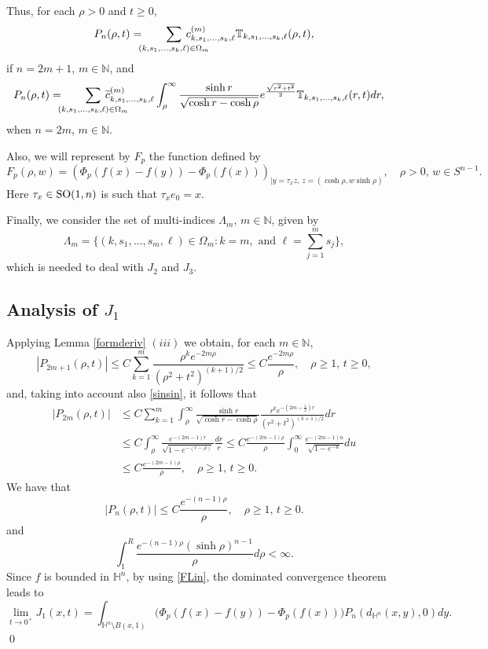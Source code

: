 \documentclass[a4paper,10pt, reqno]{amsart}
\theoremstyle{definition}
\theoremstyle{remark}
\numberwithin{equation}{section}
\begin{document}
{$$$$
Thus, for each $\rho >0$ and $t\geq 0$,
\begin{equation}\label{Pnodd}
P_n(\rho ,t)=\hspace{-0.2cm}\sum_{(k, s_1,\ldots,s_k,\ell )\in \Omega_m}\hspace{-0.8cm}c_{k,s_1,\ldots, s_k,\ell}^{(m)}\mathbb T_{k,s_1,\ldots, s_k,\ell}(\rho, t),
\end{equation}
if $n=2m+1$, $m\in \mathbb N$, and 
\begin{align}\label{Pneven}
P_n(\rho ,t)&=\hspace{-0.2cm}\sum_{(k, s_1,\ldots,s_k,\ell )\in \Omega_m}\hspace{-0.8cm}\widetilde{c}_{k,s_1,\ldots, s_k,\ell}^{(m)}\int_\rho ^\infty \frac{\sinh r}{\sqrt{\cosh r-\cosh \rho }}e^{\frac{\sqrt{r^2+t^2}}{2}}\mathbb T_{k,s_1,\ldots, s_k,\ell}(r,t)dr,
\end{align}
 when $n=2m$, $m\in \mathbb N$.
 
Also, we will represent by $F_p$ the function defined by
$$
F_p(\rho ,w)=(\Phi _p(f(x)-f(y))-\Phi _p(f(x)))_{|y=\tau _x z,\,z=(\cosh \rho ,w\sinh \rho )}, \quad \rho >0,\,w\in S^{n-1}.
$$ 
Here $\tau _x\in {\rm SO}(1,n)$ is such that $\tau_xe_0=x$.

\noindent Finally, we consider the set of multi-indices $\Lambda_m$, $m\in \mathbb N$, given by 
$$
\Lambda_m=\Big\{(k,s_1,\ldots,s_m,\ell)\in \Omega_m: k=m,\mbox{ and }\ell =\sum_{j=1}^ms_j\Big\},
$$ 
which is needed to deal with $J_2$ and $J_3$.
 
\subsection{Analysis of $J_1$}
Applying Lemma \ref{formderiv} $(iii)$ we obtain, for each $m\in \mathbb N$, 
$$
|P_{2m+1}(\rho ,t)|\leq C\sum_{k=1}^m\frac{\rho ^ke^{-2m\rho }}{(\rho ^2+t^2)^{(k+1)/2}}\leq C\frac{e^{-2m\rho}}{\rho },\quad \rho \geq 1, \,t\geq 0,
$$
and, taking into account also \eqref{sinsin}, it follows that 
\begin{align*}
|P_{2m}(\rho, t)|&\leq C\sum_{k=1}^m\int_\rho ^\infty \frac{\sinh r}{\sqrt{\cosh r-\cosh \rho }}\frac{r^ke^{-(2m-\frac{1}{2})r }}{(r^2+t^2)^{(k+1)/2}}dr\\
&\leq C\int_\rho ^\infty \frac{e^{-(2m-1)r}}{\sqrt{1-e^{-(r-\rho )}}}\frac{dr}{r}\leq C\frac{e^{-(2m-1)\rho }}{\rho}\int_0^\infty \frac{e^{-(2m-1)u}}{\sqrt{1-e^{-u}}}du\\
&\leq C\frac{e^{-(2m-1)\rho }}{\rho},\quad \rho \geq 1, \,t\geq 0.
\end{align*}
We have that
\begin{equation}\label{cotaPn}
|P_n(\rho ,t)|\leq C\frac{e^{-(n-1)\rho}}{\rho },\quad \rho \geq 1, \,t\geq 0. 
\end{equation}
and 
$$
\int_1^R\frac{e^{-(n-1)\rho}(\sinh \rho)^{n-1}}{\rho }d\rho <\infty .
$$ 
Since $f$ is bounded in $\mathbb H^n$, by using \eqref{FLin}, the dominated convergence theorem leads to 
\begin{equation}\label{J1}
\lim_{t\rightarrow 0^+}J_1(x,t)=\int_{\mathbb H^n\setminus B(x,1)}\big(\Phi _p(f(x)-f(y))-\Phi _p(f(x))\big)P_n(d_{\mathbb H^n}(x,y),0)dy.
\end{equation}
\qed

}
\end{document}

